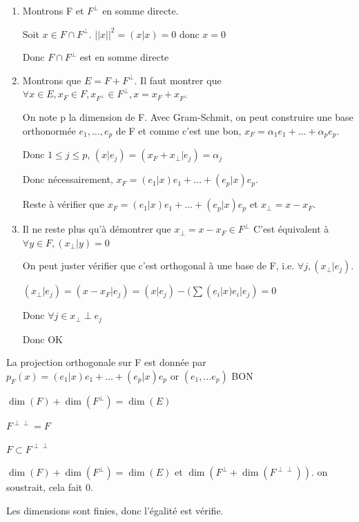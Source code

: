 \documentclass[french]{yLectureNote}
\begin{document}
\begin{myproof}
    \begin{enumerate}
        \item Montrons F et $F^{\perp}$ en somme directe.
        
        Soit $x\in F\cap F^{\perp}$. $||x||^2 = (x|x) = 0$ donc $x=0$

        Donc $F\cap F^{\perp}$ est en somme directe
        \item Montrons que $E=F+F^{\perp}$. Il faut montrer que $\forall x\in E, x_F\in F, x_{F^{\perp}} \in F^{\perp}, x= x_F  + x_{F^{\perp}}$
        
        On note p la dimension de F. Avec Gram-Schmit, on peut construire une base orthonormée $e_1,\dots, e_p$
        de F et comme c'est une bon, $x_F = \alpha_1e_1+\dots+\alpha_pe_p$. 

        Donc $1\leq j\leq p$, $(x|e_j) = (x_F+x_{\perp}|e_j) = \alpha_j$

        Donc nécessairement, $x_F = (e_1|x)e_1+\dots+(e_p|x)e_p$.

        Reste à vérifier que $x_F = (e_1|x)e_1+\dots+(e_p|x)e_p$ et $x_{\perp} = x-x_F$.
        \item Il ne reste plus qu'à démontrer que $x_{\perp} = x-x_F \in F^{\perp}$
        C'est équivalent à $\forall y\in F, (x_{\perp}|y)=0$

        On peut juster vérifier que c'est orthogonal à une base de F, i.e. $\forall j, (x_{\perp}|e_j)$.

        $(x_{\perp} |e_j) = (x-x_F|e_j) = (x|e_j)-(\sum (e_i|x)e_i|e_j) = 0$

        Donc $\forall j\in x_{\perp}\perp e_j$

        Donc OK
    \end{enumerate}
\end{myproof}
\begin{corollary}
    La projection orthogonale sur F est donnée par $p_F(x) = (e_1|x)e_1+\dots+(e_p|x)e_p$
    or $(e_1,\dots e_p)$ BON
\end{corollary}
\begin{corollary}
    $\dim(F) + \dim(F^{\perp})=\dim(E)$
\end{corollary}
\begin{corollary}
    $F^{\perp\perp} = F$
\end{corollary}
\begin{myproof}
    $F\subset F^{\perp \perp}$

    $\dim(F) + \dim(F^{\perp}) = \dim(E)$ et $\dim(F^{\perp}+\dim(F^{\perp\perp}))$. on soustrait, cela fait 0.

    Les dimensions sont finies, donc l'égalité est vérifie.
\end{myproof}
\end{document}
